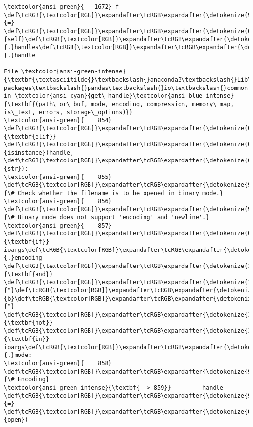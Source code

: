 \documentclass[11pt]{article}
\begin{document}
\begin{Verbatim}[commandchars=\\\{\}, frame=single, framerule=2mm, rulecolor=\color{outerrorbackground}]
\textcolor{ansi-green}{   1672} f \def\tcRGB{\textcolor[RGB]}\expandafter\tcRGB\expandafter{\detokenize{98,98,98}}{=} \def\tcRGB{\textcolor[RGB]}\expandafter\tcRGB\expandafter{\detokenize{0,135,0}}{self}\def\tcRGB{\textcolor[RGB]}\expandafter\tcRGB\expandafter{\detokenize{98,98,98}}{.}handles\def\tcRGB{\textcolor[RGB]}\expandafter\tcRGB\expandafter{\detokenize{98,98,98}}{.}handle

File \textcolor{ansi-green-intense}{\textbf{\textasciitilde{}\textbackslash{}anaconda3\textbackslash{}Lib\textbackslash{}site-packages\textbackslash{}pandas\textbackslash{}io\textbackslash{}common.py:859}}, in \textcolor{ansi-cyan}{get\_handle}\textcolor{ansi-blue-intense}{\textbf{(path\_or\_buf, mode, encoding, compression, memory\_map, is\_text, errors, storage\_options)}}
\textcolor{ansi-green}{    854} \def\tcRGB{\textcolor[RGB]}\expandafter\tcRGB\expandafter{\detokenize{0,135,0}}{\textbf{elif}} \def\tcRGB{\textcolor[RGB]}\expandafter\tcRGB\expandafter{\detokenize{0,135,0}}{isinstance}(handle, \def\tcRGB{\textcolor[RGB]}\expandafter\tcRGB\expandafter{\detokenize{0,135,0}}{str}):
\textcolor{ansi-green}{    855}     \def\tcRGB{\textcolor[RGB]}\expandafter\tcRGB\expandafter{\detokenize{95,135,135}}{\# Check whether the filename is to be opened in binary mode.}
\textcolor{ansi-green}{    856}     \def\tcRGB{\textcolor[RGB]}\expandafter\tcRGB\expandafter{\detokenize{95,135,135}}{\# Binary mode does not support 'encoding' and 'newline'.}
\textcolor{ansi-green}{    857}     \def\tcRGB{\textcolor[RGB]}\expandafter\tcRGB\expandafter{\detokenize{0,135,0}}{\textbf{if}} ioargs\def\tcRGB{\textcolor[RGB]}\expandafter\tcRGB\expandafter{\detokenize{98,98,98}}{.}encoding \def\tcRGB{\textcolor[RGB]}\expandafter\tcRGB\expandafter{\detokenize{175,0,255}}{\textbf{and}} \def\tcRGB{\textcolor[RGB]}\expandafter\tcRGB\expandafter{\detokenize{175,0,0}}{"}\def\tcRGB{\textcolor[RGB]}\expandafter\tcRGB\expandafter{\detokenize{175,0,0}}{b}\def\tcRGB{\textcolor[RGB]}\expandafter\tcRGB\expandafter{\detokenize{175,0,0}}{"} \def\tcRGB{\textcolor[RGB]}\expandafter\tcRGB\expandafter{\detokenize{175,0,255}}{\textbf{not}} \def\tcRGB{\textcolor[RGB]}\expandafter\tcRGB\expandafter{\detokenize{175,0,255}}{\textbf{in}} ioargs\def\tcRGB{\textcolor[RGB]}\expandafter\tcRGB\expandafter{\detokenize{98,98,98}}{.}mode:
\textcolor{ansi-green}{    858}         \def\tcRGB{\textcolor[RGB]}\expandafter\tcRGB\expandafter{\detokenize{95,135,135}}{\# Encoding}
\textcolor{ansi-green-intense}{\textbf{--> 859}}         handle \def\tcRGB{\textcolor[RGB]}\expandafter\tcRGB\expandafter{\detokenize{98,98,98}}{=} \def\tcRGB{\textcolor[RGB]}\expandafter\tcRGB\expandafter{\detokenize{0,135,0}}{open}(

\end{Verbatim}
\end{document}
